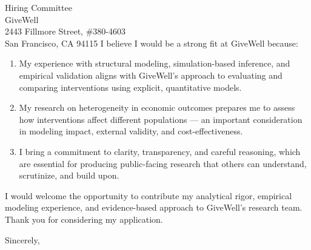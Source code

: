 \documentclass[11pt,letterpaper]{letter}
\begin{document}
\begin{letter}{Hiring Committee \\
GiveWell \\
2443 Fillmore Street, \#380-4603 \\
San Francisco, CA 94115}
I believe I would be a strong fit at GiveWell because:
\begin{enumerate}
    \item My experience with structural modeling, simulation-based inference, and empirical validation aligns with GiveWell’s approach to evaluating and comparing interventions using explicit, quantitative models.
    \item My research on heterogeneity in economic outcomes prepares me to assess how interventions affect different populations — an important consideration in modeling impact, external validity, and cost-effectiveness.
    \item I bring a commitment to clarity, transparency, and careful reasoning, which are essential for producing public-facing research that others can understand, scrutinize, and build upon.
\end{enumerate}

I would welcome the opportunity to contribute my analytical rigor, empirical modeling experience, and evidence-based approach to GiveWell’s research team. Thank you for considering my application.

\closing{Sincerely,}

\end{letter}
\end{document}
